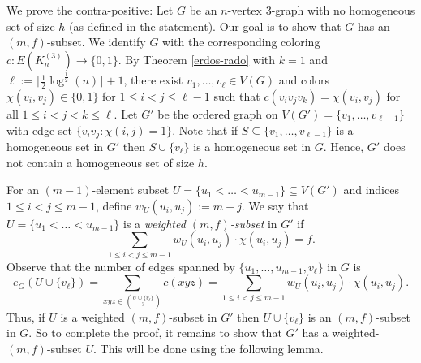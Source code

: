 \documentclass[11pt]{article}
\let\oldendproof\endproof
\renewenvironment{proof}[1][\proofname]{%
	\oldproof[\bf #1]%
}{\oldendproof}
\theoremstyle{plain}
\begin{document}
\begin{proof}
    We prove the contra-positive: Let $G$ be an $n$-vertex $3$-graph with no homogeneous set of size $h$ (as defined in the statement).
    Our goal is to show that $G$ has an $(m,f)$-subset. 
    We identify $G$ with the corresponding coloring $c:E(K_n^{(3)}) \to \{0,1\}$. 
    By Theorem \ref{erdos-rado} with $k = 1$ and  
    $\ell := \lceil \frac{1}{2}\log^{\frac{1}{2}}(n) \rceil + 1$, there exist $v_1,\dots,v_{\ell} \in V(G)$ and colors $\chi(v_i,v_j) \in \{0,1\}$ for $1 \leq i < j \leq \ell-1$ such that $c(v_iv_jv_k) = \chi(v_i,v_j)$ for all $1\leq i < j < k \leq \ell$. 
    Let $G'$ be the ordered graph on $V(G') = \{v_1,\dots,v_{\ell-1}\}$ with edge-set $\{v_iv_j : \chi(i,j) = 1\}$. 
    Note that if $S \subseteq \{v_1,\dots,v_{\ell-1}\}$ is a homogeneous set in $G'$ then 
    $S \cup \{v_{{\ell}}\}$ is a homogeneous set in $G$. Hence, $G'$ does not contain a homogeneous set of size $h$.
    
    

    For an $(m-1)$-element subset $U = \{u_1 < \dots < u_{m-1}\} \subseteq V(G')$ and indices $1 \leq i < j \leq m-1$, define $w_U(u_i,u_j) := m-j$. We say that $U = \{u_1 < \dots < u_{m-1}\}$ is a {\em weighted $(m,f)$-subset} in $G'$ if 
    $$
    \sum_{1 \leq i < j \leq m-1} w_U(u_i,u_j) \cdot \chi(u_i,u_j) = f.
    $$
    Observe that the number of edges spanned by $\{u_1,\dots,u_{m-1},v_{\ell}\}$ in $G$ is
    $$e_G(U \cup \{v_{\ell}\}) = 
    \sum_{xyz \in \binom{U \cup \{v_{\ell}\}}{3}} c(xyz) = 
    \sum_{1 \leq i < j \leq m-1} w_U(u_i,u_j) \cdot \chi(u_i,u_j).
    $$ 
    Thus, if $U$ is a weighted $(m,f)$-subset in $G'$ then $U \cup \{v_{\ell}\}$ is an $(m,f)$-subset in $G$.
    So to complete the proof, it remains to show that $G'$ has a weighted-$(m,f)$-subset $U$. This will be done using the following lemma.


\end{proof}
\end{document}
